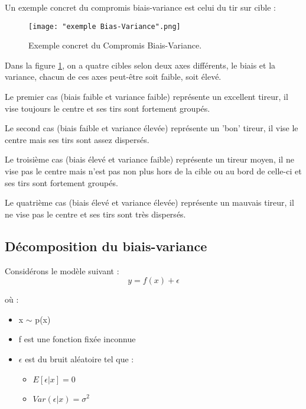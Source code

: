 \documentclass[a4paper]{article}
\begin{document}
\newpage

Un exemple concret du compromis biais-variance est celui du tir sur cible :

\begin{figure}[!h]
	\centering
	\texttt{[image: "exemple Bias-Variance".png]}
	\caption{Exemple concret du Compromis Biais-Variance.} \cite{UnderstandingBiasVarianceTradeoff}
	\label{ConcreteExample}
\end{figure}

Dans la figure \ref{ConcreteExample}, on a quatre cibles selon deux axes différents, le biais et la variance, chacun de ces axes peut-être soit faible, soit élevé. \par

Le premier cas (biais faible et variance faible) représente un excellent tireur, il vise toujours le centre et ses tirs sont fortement groupés. \par

Le second cas (biais faible et variance élevée) représente un 'bon' tireur, il vise le centre mais ses tirs sont assez dispersés. \par

Le troisième cas (biais élevé et variance faible) représente un tireur moyen, il ne vise pas le centre mais n'est pas non plus hors de la cible ou au bord de celle-ci et ses tirs sont fortement groupés. \par

Le quatrième cas (biais élevé et variance élevée) représente un mauvais tireur, il ne vise pas le centre et ses tirs sont très dispersés. \par

\newpage

\subsection{Décomposition du biais-variance}
\label{decomposition_Biais_Variance_section}

Considérons le modèle suivant : 
\begin{equation}
\label{decomposition_Biais_Variance}
y = f(x) + \epsilon
\end{equation}

où : 

\begin{itemize}
	\item x $\sim$ p(x)
	\item f est une fonction fixée inconnue
	\item $\epsilon$ est du bruit aléatoire tel que :
	\begin{itemize}
		\item $E[\epsilon|x] = 0$
		\item $Var(\epsilon|x) = \sigma^2$
	\end{itemize}
\end{itemize}
\end{document}
